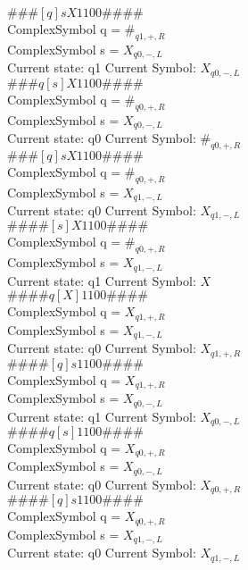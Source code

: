 \documentclass[10pt, a4paper]{article}
\begin{document}
$\# \#\# [ q ] s X 1 1 0 0 \# \# \# \# $ \\
ComplexSymbol q = $\#_{q1,+,R}$ \\
ComplexSymbol s = $X_{q0,-,L}$ \\ 
 \medskip
Current state: q1	 Current Symbol: 	 $X_{q0,-,L}$\\
$\# \#\# q [ s ] X 1 1 0 0 \# \# \# \# $ \\
ComplexSymbol q = $\#_{q0,+,R}$ \\
ComplexSymbol s = $X_{q0,-,L}$ \\ 
 \medskip
Current state: q0	 Current Symbol: 	 $\#_{q0,+,R}$\\
$\# \#\# [ q ] s X 1 1 0 0 \# \# \# \# $ \\
ComplexSymbol q = $\#_{q0,+,R}$ \\
ComplexSymbol s = $X_{q1,-,L}$ \\ 
 \medskip
Current state: q0	 Current Symbol: 	 $X_{q1,-,L}$\\
$\# \#\# \# [ s ] X 1 1 0 0 \# \# \# \# $ \\
ComplexSymbol q = $\#_{q0,+,R}$ \\
ComplexSymbol s = $X_{q1,-,L}$ \\ 
 \medskip
Current state: q1	 Current Symbol: 	 $X$\\
$\# \#\# \# q [ X ] 1 1 0 0 \# \# \# \# $ \\
ComplexSymbol q = $X_{q1,+,R}$ \\
ComplexSymbol s = $X_{q1,-,L}$ \\ 
 \medskip
Current state: q0	 Current Symbol: 	 $X_{q1,+,R}$\\
$\# \#\# \# [ q ] s 1 1 0 0 \# \# \# \# $ \\
ComplexSymbol q = $X_{q1,+,R}$ \\
ComplexSymbol s = $X_{q0,-,L}$ \\ 
 \medskip
Current state: q1	 Current Symbol: 	 $X_{q0,-,L}$\\
$\# \#\# \# q [ s ] 1 1 0 0 \# \# \# \# $ \\
ComplexSymbol q = $X_{q0,+,R}$ \\
ComplexSymbol s = $X_{q0,-,L}$ \\ 
 \medskip
Current state: q0	 Current Symbol: 	 $X_{q0,+,R}$\\
$\# \#\# \# [ q ] s 1 1 0 0 \# \# \# \# $ \\
ComplexSymbol q = $X_{q0,+,R}$ \\
ComplexSymbol s = $X_{q1,-,L}$ \\ 
 \medskip
Current state: q0	 Current Symbol: 	 $X_{q1,-,L}$\\
\end{document}
